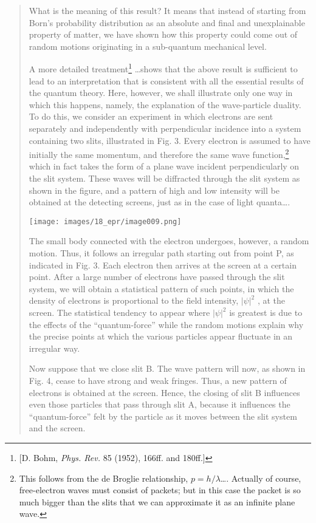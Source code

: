 \documentclass[11pt]{memoir}
\begin{document}
\begin{quote}
What is the meaning of this result? It means that instead of starting
from Born's probability distribution as an absolute and final and
unexplainable property of matter, we have shown how this property could
come out of random motions originating in a sub-quantum mechanical
level.

A more detailed treatment\footnote{{[}D. Bohm, \emph{Phys. Rev.} 85
  (1952), 166ff. and 180ff.{]}} \ldots shows that the above result is
sufficient to lead to an interpretation that is consistent with all the
essential results of the quantum theory. Here, however, we shall
illustrate only one way in which this happens, namely, the explanation
of the wave-particle duality. To do this, we consider an experiment in
which electrons are sent separately and independently with perpendicular
incidence into a system containing two slits, illustrated in Fig. 3.
Every electron is assumed to have initially the same momentum, and
therefore the same wave function,\footnote{This follows from the de
  Broglie relationship, $p = h/\lambda$\ldots. Actually of
  course, free-electron waves must consist of packets; but in this case
  the packet is so much bigger than the slits that we can approximate it
  as an infinite plane wave.} which in fact takes the form of a plane
wave incident perpendicularly on the slit system. These waves will be
diffracted through the slit system as shown in the figure, and a pattern
of high and low intensity will be obtained at the detecting screens,
just as in the case of light quanta\ldots.

\texttt{[image: images/18\_epr/image009.png]}


The small body connected with the electron undergoes, however, a random
motion. Thus, it follows an irregular path starting out from point P, as
indicated in Fig. 3. Each electron then arrives at the screen at a
certain point. After a large number of electrons have passed through the
slit system, we will obtain a statistical pattern of such points, in
which the density of electrons is proportional to the field intensity, $|\psi|^2$ ,
at the screen. The statistical tendency to appear where $|\psi|^2$ is greatest is
due to the effects of the ``quantum-force'' while the random motions
explain why the precise points at which the various particles appear
fluctuate in an irregular way.

Now suppose that we close slit B. The wave pattern will now, as shown in
Fig. 4, cease to have strong and weak fringes. Thus, a new pattern of
electrons is obtained at the screen. Hence, the closing of slit B
influences even those particles that pass through slit A, because it
influences the ``quantum-force'' felt by the particle as it moves
between the slit system and the screen.


\end{quote}
\end{document}
